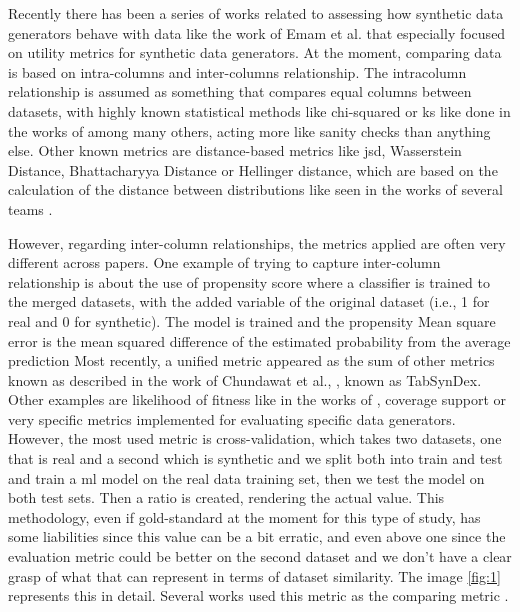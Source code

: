 
Recently there has been a series of works related to assessing how synthetic data generators behave with data like the work of Emam et al. \cite{emamUtilityMetricsEvaluating2022} that especially focused on utility metrics for synthetic data generators. At the moment, comparing data is based on intra-columns and inter-columns relationship. The intracolumn relationship is assumed as something that compares equal columns between datasets, with highly known statistical methods like chi-squared or \ac{ks} like done in the works of \cite{combrinkComparingSyntheticTabular2022} among many others, acting more like sanity checks than anything else. 
Other known metrics are distance-based metrics like \ac{jsd}, Wasserstein Distance, Bhattacharyya Distance or Hellinger distance, which are based on the calculation of the distance between distributions like seen in the works of several teams \cite{ISI:000557358500024,choiGeneratingMultilabelDiscrete2017,Baowaly2019}.

However, regarding inter-column relationships, the metrics applied are often very different across papers. One example of trying to capture inter-column relationship is about the use of propensity score \cite{rosenbaumCentralRolePropensity1983,mullerEvaluationSyntheticElectronic2022} where a classifier is trained to the merged datasets, with the added variable of the original dataset (i.e., 1 for real and 0 for synthetic). The model is trained and the propensity Mean square error is the  mean squared difference of the estimated probability from the average prediction
Most recently, a unified metric appeared as the sum of other metrics known as described in the work of Chundawat et al., \cite{chundawatTabSynDexUniversalMetric2022}, known as TabSynDex. Other examples are likelihood of fitness like in the works of \cite{xuModelingTabularData2019b}, coverage support \cite{goncalvesGenerationEvaluationSynthetic2020a} or very specific metrics implemented for evaluating specific data generators.
However, the most used metric is cross-validation, which takes two datasets, one that is real and a second which is synthetic and we split both into train and test and train a \ac{ml} model on the real data training set, then we test the model on both test sets. Then a ratio is created, rendering the actual value. This methodology, even if gold-standard at the moment for this type of study, has some liabilities since this value can be a bit erratic, and even above one since the evaluation metric could be better on the second dataset and we don't have a clear grasp of what that can represent in terms of dataset similarity. The image \ref{fig:1} represents this in detail. Several works used this metric as the comparing metric \cite{mullerEvaluationSyntheticElectronic2022}.

